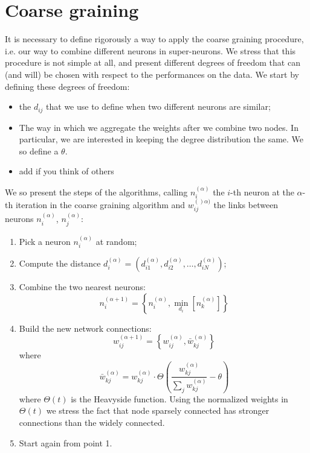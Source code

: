 \section{Coarse graining}
It is necessary to define rigorously a way to apply the 
coarse graining procedure, i.e. our way to combine different
neurons in super-neurons. We stress that this procedure
is not simple at all, and present different degrees of freedom
that can (and will) be chosen with respect to the performances
on the data. We start by defining these degrees of freedom:
\begin{itemize}
    \item the  $d_{ij}$ that we use to define when two 
        different neurons are similar;
    \item The way in which we aggregate the weights after we combine 
        two nodes. In particular, we are interested in keeping the 
        degree distribution the same. We so define a  $\theta$.
    \item add if you think of others
\end{itemize}
We so present the steps of the algorithms, calling $n_i^(\alpha)$ the $i$-th 
neuron at the $\alpha$-th iteration in the coarse graining algorithm and $w_{ij}^{()\alpha)}$
the links between neurons $n_i^{(\alpha)}$, $n_j^{(\alpha)}$:
\begin{enumerate}
    \item Pick a neuron $n_i^{(\alpha)}$ at random;
    \item Compute the distance $d_i^{(\alpha)}=(d_{i1}^{(\alpha)}, d_{i2}^{(\alpha)}, \dots, d_{iN}^{(\alpha)})$;
    \item Combine the two nearest neurons:
        $$
        n_i^{(\alpha+1)} = \left\{ n_i^{(\alpha)}, \min_{d_i}\left[n_k^{(\alpha)}\right] \right\}
        $$
    \item Build the new network connections:
        $$
        w_{ij}^{(\alpha+1)} = \left\{ w_{ij}^{(\alpha)}, \bar{w}_{kj}^{(\alpha)}   \right\}
        $$
        where
        $$
        \bar{w}_{kj}^{(\alpha)}= w_{kj}^{(\alpha)}\cdot \Theta\left( \frac{w_{kj}^{(\alpha)}}{\sum_j w_{kj}^{(\alpha)}}-\theta \right)
        $$
        where $\Theta(t)$ is the Heavyside function. Using the normalized weights in $\Theta(t)$ we
        stress the fact that node sparsely connected has stronger connections than the widely connected.
    \item Start again from point 1.
\end{enumerate} 




